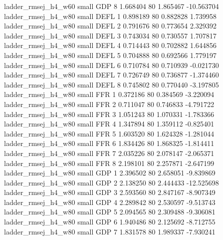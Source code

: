      ladder_rmsej_h4_w60      small      GDP                 8 1.668404 80       1.865467         -10.563704
     ladder_rmsej_h4_w80      small     DEFL                 1 0.898189 80       0.882828           1.739958
     ladder_rmsej_h4_w80      small     DEFL                 2 0.791676 80       0.773654           2.329392
     ladder_rmsej_h4_w80      small     DEFL                 3 0.743034 80       0.730557           1.707817
     ladder_rmsej_h4_w80      small     DEFL                 4 0.714443 80       0.702882           1.644856
     ladder_rmsej_h4_w80      small     DEFL                 5 0.704888 80       0.692566           1.779197
     ladder_rmsej_h4_w80      small     DEFL                 6 0.710784 80       0.710939          -0.021730
     ladder_rmsej_h4_w80      small     DEFL                 7 0.726749 80       0.736877          -1.374460
     ladder_rmsej_h4_w80      small     DEFL                 8 0.745802 80       0.770440          -3.197805
     ladder_rmsej_h4_w80      small      FFR                 1 0.372186 80       0.384569          -3.220094
     ladder_rmsej_h4_w80      small      FFR                 2 0.711047 80       0.746833          -4.791722
     ladder_rmsej_h4_w80      small      FFR                 3 1.051243 80       1.070331          -1.783366
     ladder_rmsej_h4_w80      small      FFR                 4 1.347894 80       1.359112          -0.825401
     ladder_rmsej_h4_w80      small      FFR                 5 1.603520 80       1.624328          -1.281044
     ladder_rmsej_h4_w80      small      FFR                 6 1.834426 80       1.868325          -1.814411
     ladder_rmsej_h4_w80      small      FFR                 7 2.035226 80       2.078147          -2.065371
     ladder_rmsej_h4_w80      small      FFR                 8 2.198101 80       2.257871          -2.647199
     ladder_rmsej_h4_w80      small      GDP                 1 2.396502 80       2.658051          -9.839869
     ladder_rmsej_h4_w80      small      GDP                 2 2.138250 80       2.444433         -12.525698
     ladder_rmsej_h4_w80      small      GDP                 3 2.593560 80       2.847167          -8.907349
     ladder_rmsej_h4_w80      small      GDP                 4 2.289842 80       2.530597          -9.513743
     ladder_rmsej_h4_w80      small      GDP                 5 2.094565 80       2.309488          -9.306081
     ladder_rmsej_h4_w80      small      GDP                 6 1.940486 80       2.125692          -8.712755
     ladder_rmsej_h4_w80      small      GDP                 7 1.831578 80       1.989337          -7.930241
